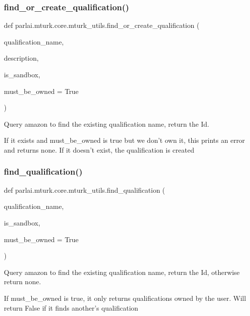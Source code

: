 \subsubsection{\texorpdfstring{find\+\_\+or\+\_\+create\+\_\+qualification()}{find\_or\_create\_qualification()}}
{\footnotesize\ttfamily def parlai.\+mturk.\+core.\+mturk\+\_\+utils.\+find\+\_\+or\+\_\+create\+\_\+qualification (\begin{DoxyParamCaption}\item[{}]{qualification\+\_\+name,  }\item[{}]{description,  }\item[{}]{is\+\_\+sandbox,  }\item[{}]{must\+\_\+be\+\_\+owned = {\ttfamily True} }\end{DoxyParamCaption})}

\begin{DoxyVerb}Query amazon to find the existing qualification name, return the Id.

If it exists and must_be_owned is true but we don't own it, this prints an error and
returns none. If it doesn't exist, the qualification is created
\end{DoxyVerb}
 \mbox{\label{namespaceparlai_1_1mturk_1_1core_1_1mturk__utils_a54121023abc81124ba03cc50d5f23af3}} 
\subsubsection{\texorpdfstring{find\+\_\+qualification()}{find\_qualification()}}
{\footnotesize\ttfamily def parlai.\+mturk.\+core.\+mturk\+\_\+utils.\+find\+\_\+qualification (\begin{DoxyParamCaption}\item[{}]{qualification\+\_\+name,  }\item[{}]{is\+\_\+sandbox,  }\item[{}]{must\+\_\+be\+\_\+owned = {\ttfamily True} }\end{DoxyParamCaption})}

\begin{DoxyVerb}Query amazon to find the existing qualification name, return the Id, otherwise
return none.

If must_be_owned is true, it only returns qualifications owned by the user. Will
return False if it finds another's qualification
\end{DoxyVerb}
 \mbox{\label{namespaceparlai_1_1mturk_1_1core_1_1mturk__utils_a577e2527c04682284394b0951a090695}} 
